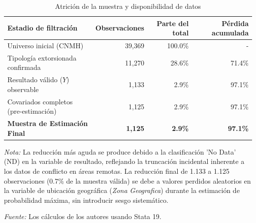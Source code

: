 \documentclass[12pt]{article}
\theoremstyle{definition}
\theoremstyle{remark}
\newcommand{\1}{\mathbf{1}}
\begin{document}
\begin{table}[htbp]
\centering
\caption{Atrición de la muestra y disponibilidad de datos}
\label{Table_1}
\begin{threeparttable}
\begin{tabularx}{\textwidth}{@{} X r r r @{}}
\toprule
\textbf{Estadio de filtración} & \textbf{Observaciones} & \textbf{Parte del total} & \textbf{Pérdida acumulada} \\
\midrule
Universo inicial (CNMH) & 39,369 & 100.0\% & - \\
Tipología extorsionada confirmada & 11,270 & 28.6\% & 71.4\% \\
Resultado válido ($Y$) observable & 1,133 & 2.9\% & 97.1\% \\
Covariados completos (pre-estimación) & 1,125 & 2.9\% & 97.1\% \\
\textbf{Muestra de Estimación Final}  & \textbf{1,125} & \textbf{2.9\%} & \textbf{97.1\%} \\
\bottomrule
\end{tabularx}
\begin{tablenotes}
\footnotesize
\item \textit{Nota:} La reducción más aguda se produce debido a la clasificación 'No Data' (ND) en la variable de resultado, reflejando la truncación incidental inherente a los datos de conflicto en áreas remotas. La reducción final de 1.133 a 1.125 observaciones (0.7\% de la muestra válida) se debe a valores perdidos aleatorios en la variable de ubicación geográfica (\textit{Zona Geografica}) durante la estimación de probabilidad máxima, sin introducir sesgo sistemático.
\item \textit{Fuente:} Los cálculos de los autores usando Stata 19.
\end{tablenotes}
\end{threeparttable}
\end{table}
\end{document}
